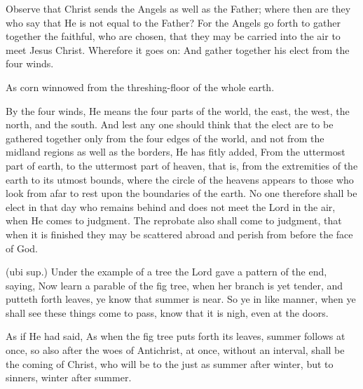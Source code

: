 Observe that Christ sends the Angels as well as the Father; where then are they who say that He is not equal to the Father? For the Angels go forth to gather together the faithful, who are chosen, that they may be carried into the air to meet Jesus Christ. Wherefore it goes on: And gather together his elect from the four winds.

 As corn winnowed from the threshing-floor of the whole earth.

 By the four winds, He means the four parts of the world, the east, the west, the north, and the south. And lest any one should think that the elect are to be gathered together only from the four edges of the world, and not from the midland regions as well as the borders, He has fitly added, From the uttermost part of earth, to the uttermost part of heaven, that is, from the extremities of the earth to its utmost bounds, where the circle of the heavens appears to those who look from afar to rest upon the boundaries of the earth. No one therefore shall be elect in that day who remains behind and does not meet the Lord in the air, when He comes to judgment. The reprobate also shall come to judgment, that when it is finished they may be scattered abroad and perish from before the face of God.

 

 (ubi sup.) Under the example of a tree the Lord gave a pattern of the end, saying, Now learn a parable of the fig tree, when her branch is yet tender, and putteth forth leaves, ye know that summer is near. So ye in like manner, when ye shall see these things come to pass, know that it is nigh, even at the doors.

 As if He had said, As when the fig tree puts forth its leaves, summer follows at once, so also after the woes of Antichrist, at once, without an interval, shall be the coming of Christ, who will be to the just as summer after winter, but to sinners, winter after summer.

